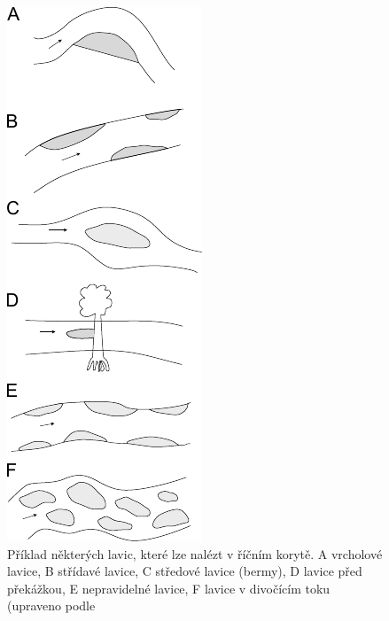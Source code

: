 \begin{figure}
	\centering
	\includegraphics[width=1\linewidth]{obrazky/fluvial/lavice}
	\caption{Příklad některých lavic, které lze nalézt v říčním korytě. A vrcholové lavice, B střídavé lavice, C středové lavice (bermy), D lavice před překážkou, E nepravidelné lavice, F lavice v divočícím toku  (upraveno podle \textcite{radecki-pawlikStreamHydraulicsGranulometry2004} }
	\label{fig:lavice}
\end{figure}

